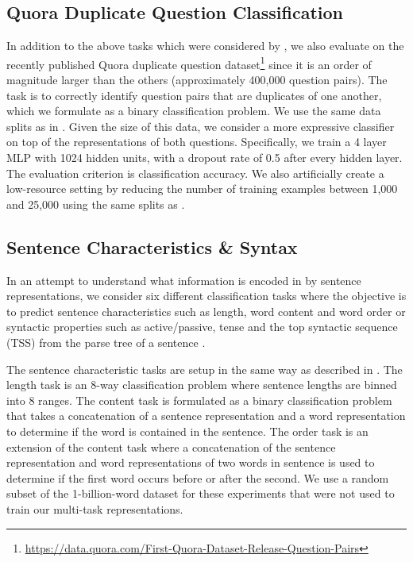\documentclass{article} \usepackage{iclr2018_conference,times}
\begin{document}
\subsection{Quora Duplicate Question Classification}
In addition to the above tasks which were considered by \cite{conneau2017supervised}, we also evaluate on the recently published Quora duplicate question dataset\footnote{\url{https://data.quora.com/First-Quora-Dataset-Release-Question-Pairs}} since it is an order of magnitude larger than the others (approximately 400,000 question pairs). The task is to correctly identify question pairs that are duplicates of one another, which we formulate as a binary classification problem. We use the same data splits as in \cite{wang2017bilateral}. Given the size of this data, we consider a more expressive classifier on top of the representations of both questions. Specifically, we train a 4 layer MLP with 1024 hidden units, with a dropout rate of 0.5 after every hidden layer. The evaluation criterion is classification accuracy. We also artificially create a low-resource setting by reducing the number of training examples between 1,000 and 25,000 using the same splits as \cite{shen2017deconvolutional}.

\subsection{Sentence Characteristics \& Syntax}
In an attempt to understand what information is encoded in by sentence representations, we consider six different classification tasks where the objective is to predict sentence characteristics such as length, word content and word order \citep{adi2016fine} or syntactic properties such as active/passive, tense and the top syntactic sequence (TSS) from the parse tree of a sentence \citep{shi2016does}.

The sentence characteristic tasks are setup in the same way as described in \cite{adi2016fine}. The length task is an 8-way classification problem where sentence lengths are binned into 8 ranges. The content task is formulated as a binary classification problem that takes a concatenation of a sentence representation  and a word representation  to determine if the word is contained in the sentence. The order task is an extension of the content task where a concatenation of the sentence representation and word representations of two words in sentence is used to determine if the first word occurs before or after the second. We use a random subset of the 1-billion-word dataset for these experiments that were not used to train our multi-task representations.
\end{document}
